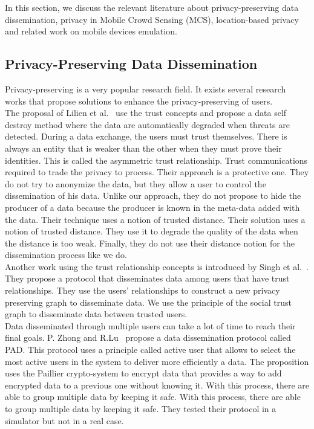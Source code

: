 

In this section, we discuss the relevant literature about privacy-preserving data dissemination, privacy in Mobile Crowd Sensing (MCS), location-based privacy and related work on mobile devices emulation.

\subsection{Privacy-Preserving Data Dissemination}

Privacy-preserving is a very popular research field.
It exists several research works that propose solutions to enhance the privacy-preserving of users.
\\

The proposal of Lilien et al.~\cite{DBLP:journals/tsmc/LilienB06} use the trust concepts and propose a data self destroy method where the data are automatically degraded when threats are detected.
During a data exchange, the users must trust themselves.
There is always an entity that is weaker than the other when they must prove their identities.
This is called the asymmetric trust relationship.
Trust communications required to trade the privacy to process.
Their approach is a protective one.
They do not try to anonymize the data, but they allow a user to control the dissemination of his data.
Unlike our approach, they do not propose to hide the producer of a data because the producer is known in the meta-data added with the data.
Their technique uses a notion of trusted distance.
Their solution uses a notion of trusted distance.
They use it to degrade the quality of the data when the distance is too weak.
Finally, they do not use their distance notion for the dissemination process like we do.
\\

Another work using the trust relationship concepts is introduced by Singh et al.~\cite{DBLP:conf/icdcs/SinghUSV12}.
They propose a protocol that disseminates data among users that have trust relationships.
They use the users' relationships to construct a new privacy preserving graph to disseminate data. 
We use the principle of the social trust graph to disseminate data between trusted users.
\\

Data disseminated through multiple users can take a lot of time to reach their final goals.
P. Zhong and R.Lu~\cite{DBLP:conf/iccoms/ZhongL14} propose a data dissemination protocol called PAD.
This protocol uses a principle called active user that allows to select the most active users in the system to deliver more efficiently a data.
The proposition uses the Paillier crypto-system to encrypt data that provides a way to add encrypted data to a previous one without knowing it. 
With this process, there are able to group multiple data by keeping it safe.
With this process, there are able to group multiple data by keeping it safe.
They tested their protocol in a simulator but not in a real case.
\\

